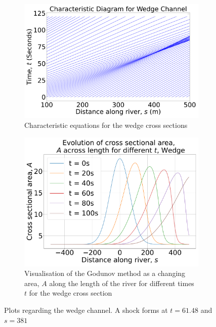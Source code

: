 \documentclass[12pt]{article}
\begin{document}
\begin{figure}[H]
    \centering
    \begin{subfigure}[b]{0.49\textwidth}
        \centering
        \includegraphics[width=\textwidth]{Figures/Wedge_characteristic.pdf}
        \caption{Characteristic equations for the wedge cross sections}
        \label{fig:wedge_char}
    \end{subfigure}
    \hfill
    \begin{subfigure}[b]{0.49\textwidth}
        \centering
        \includegraphics[width=\textwidth]{Figures/Wedge_godunov.pdf}
        \caption{Visualisation of the Godunov method as a changing area, $A$ along the length of the river for different times $t$ for the wedge cross section}
        \label{fig:wedge_godunov}
    \end{subfigure}
    \caption{Plots regarding the wedge channel. A shock forms at $t = 61.48$ and $s = 381$}
\end{figure}
\end{document}
